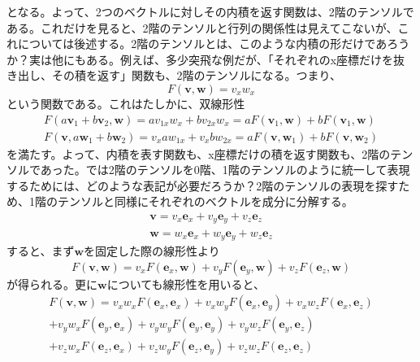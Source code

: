 となる。よって、2つのベクトルに対しその内積を返す関数は、2階のテンソルである。これだけを見ると、2階のテンソルと行列の関係性は見えてこないが、これについては後述する。2階のテンソルとは、このような内積の形だけであろうか？実は他にもある。例えば、多少突飛な例だが、「それぞれのx座標だけを抜き出し、その積を返す」関数も、2階のテンソルになる。つまり、
\begin{equation}
	F(\boldsymbol{v},\boldsymbol{w})= v_x w_x
\end{equation}
という関数である。これはたしかに、双線形性
\begin{equation}
	\begin{aligned}
		F(a\boldsymbol{v}_1+b\boldsymbol{v}_2,\boldsymbol{w})
		=a{v}_{1x}{w}_x+b{v}_{2x}w_x=aF(\boldsymbol{v}_1,\boldsymbol{w})+bF(\boldsymbol{v}_1,\boldsymbol{w}) \\
		F(\boldsymbol{v},a\boldsymbol{w}_1+b\boldsymbol{w}_2)
		={v}_xa{w}_{1x}+{v}_xb{w}_{2x}
		=aF(\boldsymbol{v},\boldsymbol{w}_1)+bF(\boldsymbol{v},\boldsymbol{w}_2)
	\end{aligned}
\end{equation}
を満たす。よって、内積を表す関数も、x座標だけの積を返す関数も、2階のテンソルであった。では2階のテンソルを0階、1階のテンソルのように統一して表現するためには、どのような表記が必要だろうか？2階のテンソルの表現を探すため、1階のテンソルと同様にそれぞれのベクトルを成分に分解する。
\begin{equation}
	\begin{aligned}
		\boldsymbol{v}=   v_x\boldsymbol{e}_x+v_y\boldsymbol{e}_y+v_z\boldsymbol{e}_z \\
		\boldsymbol{w}=  w_x\boldsymbol{e}_x+w_y\boldsymbol{e}_y+w_z\boldsymbol{e}_z
	\end{aligned}
\end{equation}
すると、まず\(\boldsymbol{w}\)を固定した際の線形性より
\begin{equation}
	F(\boldsymbol{v},\boldsymbol{w})=v_xF(\boldsymbol{e}_x,\boldsymbol{w})+v_yF(\boldsymbol{e}_y,\boldsymbol{w})+v_zF(\boldsymbol{e}_z,\boldsymbol{w})
\end{equation}
が得られる。更に\(\boldsymbol{w}\)についても線形性を用いると、
\begin{equation}
	\begin{aligned}
		F(\boldsymbol{v},\boldsymbol{w}) =v_x w_xF(\boldsymbol{e}_x,\boldsymbol{e}_x) + v_x w_yF(\boldsymbol{e}_x,\boldsymbol{e}_y) +v_x w_zF(\boldsymbol{e}_x,\boldsymbol{e}_z) \\
		+v_y w_xF(\boldsymbol{e}_y,\boldsymbol{e}_x) + v_y w_yF(\boldsymbol{e}_y,\boldsymbol{e}_y) +v_y w_zF(\boldsymbol{e}_y,\boldsymbol{e}_z)                                  \\
		+v_z w_xF(\boldsymbol{e}_z,\boldsymbol{e}_x) + v_z w_yF(\boldsymbol{e}_z,\boldsymbol{e}_y) +v_z w_zF(\boldsymbol{e}_z,\boldsymbol{e}_z)
	\end{aligned}
\end{equation}
